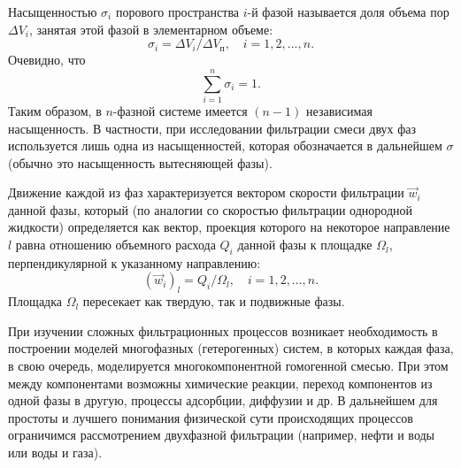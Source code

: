 Насыщенностью $\sigma_i$ порового пространства $i$-й фазой называется доля объема пор $\Delta V_i$, занятая этой фазой в элементарном объеме:
\begin{equation}\sigma_i=\Delta V_i/\Delta V_\text{п},\quad i=1,2,\ldots,n.\tag{9.1}\label{q10:eq-9-1}\end{equation}
Очевидно, что
\begin{equation}\sum_{i=1}^n\sigma_i=1.\tag{9.2}\label{q10:eq-9-2}\end{equation}
Таким образом, в $n$-фазной системе имеется $(n-1)$ независимая насыщенность. В частности, при исследовании фильтрации смеси двух фаз используется лишь одна из насыщенностей, которая обозначается в дальнейшем $\sigma$ (обычно это насыщенность вытесняющей фазы).

Движение каждой из фаз характеризуется вектором скорости фильтрации $\vec w_i$ данной фазы, который (по аналогии со скоростью фильтрации однородной жидкости) определяется как вектор, проекция которого на некоторое направление $l$ равна отношению объемного расхода $Q_i$ данной фазы к площадке $\Omega_l$, перпендикулярной к указанному направлению:
\begin{equation}(\vec w_i)_l=Q_i/\Omega_l,\quad i=1,2,\ldots,n.\tag{9.3}\label{q10:eq-9-3}\end{equation}
Площадка $\Omega_l$ пересекает как твердую, так и подвижные фазы.

При изучении сложных фильтрационных процессов возникает необходимость в построении моделей многофазных (гетерогенных) систем, в которых каждая фаза, в свою очередь, моделируется многокомпонентной гомогенной смесью. При этом между компонентами возможны химические реакции, переход компонентов из одной фазы в другую, процессы адсорбции, диффузии и др. В дальнейшем для простоты и лучшего понимания физической сути происходящих процессов ограничимся рассмотрением двухфазной фильтрации (например, нефти и воды или воды и газа).

